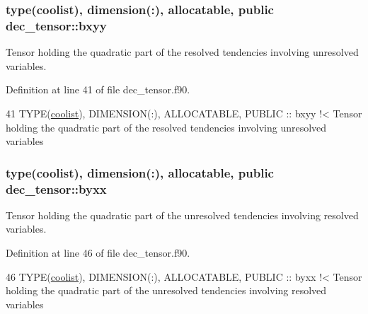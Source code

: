 \subsubsection[{\texorpdfstring{bxyy}{bxyy}}]{\setlength{\rightskip}{0pt plus 5cm}type({\bf coolist}), dimension(\+:), allocatable, public dec\+\_\+tensor\+::bxyy}\hypertarget{namespacedec__tensor_aa11fd10e3419deddd481098f4a2d2949}{}\label{namespacedec__tensor_aa11fd10e3419deddd481098f4a2d2949}


Tensor holding the quadratic part of the resolved tendencies involving unresolved variables. 



Definition at line 41 of file dec\+\_\+tensor.\+f90.


\begin{DoxyCode}
41   \textcolor{keywordtype}{TYPE}(\hyperlink{structtensor_1_1coolist}{coolist}), \textcolor{keywordtype}{DIMENSION(:)}, \textcolor{keywordtype}{ALLOCATABLE}, \textcolor{keywordtype}{PUBLIC} :: bxyy\textcolor{comment}{ !< Tensor holding the quadratic part of
       the resolved tendencies involving unresolved variables}
\end{DoxyCode}
\subsubsection[{\texorpdfstring{byxx}{byxx}}]{\setlength{\rightskip}{0pt plus 5cm}type({\bf coolist}), dimension(\+:), allocatable, public dec\+\_\+tensor\+::byxx}\hypertarget{namespacedec__tensor_adb81ce421da8f2b1c972c63ccdce6214}{}\label{namespacedec__tensor_adb81ce421da8f2b1c972c63ccdce6214}


Tensor holding the quadratic part of the unresolved tendencies involving resolved variables. 



Definition at line 46 of file dec\+\_\+tensor.\+f90.


\begin{DoxyCode}
46   \textcolor{keywordtype}{TYPE}(\hyperlink{structtensor_1_1coolist}{coolist}), \textcolor{keywordtype}{DIMENSION(:)}, \textcolor{keywordtype}{ALLOCATABLE}, \textcolor{keywordtype}{PUBLIC} :: byxx\textcolor{comment}{ !< Tensor holding the quadratic part of
       the unresolved tendencies involving resolved variables}
\end{DoxyCode}
